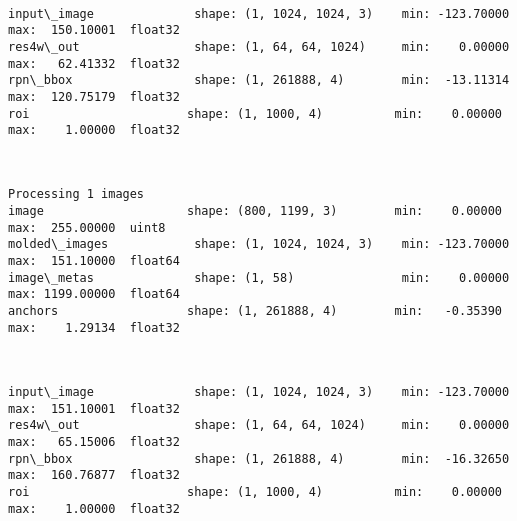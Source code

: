 \documentclass[11pt]{article}
\begin{document}
    \begin{center}
    \end{center}
    { \hspace*{\fill} \\}
    
    \begin{Verbatim}[commandchars=\\\{\}]
input\_image              shape: (1, 1024, 1024, 3)    min: -123.70000  max:  150.10001  float32
res4w\_out                shape: (1, 64, 64, 1024)     min:    0.00000  max:   62.41332  float32
rpn\_bbox                 shape: (1, 261888, 4)        min:  -13.11314  max:  120.75179  float32
roi                      shape: (1, 1000, 4)          min:    0.00000  max:    1.00000  float32

    \end{Verbatim}

    \begin{center}
    \end{center}
    { \hspace*{\fill} \\}
    
    \begin{Verbatim}[commandchars=\\\{\}]
Processing 1 images
image                    shape: (800, 1199, 3)        min:    0.00000  max:  255.00000  uint8
molded\_images            shape: (1, 1024, 1024, 3)    min: -123.70000  max:  151.10000  float64
image\_metas              shape: (1, 58)               min:    0.00000  max: 1199.00000  float64
anchors                  shape: (1, 261888, 4)        min:   -0.35390  max:    1.29134  float32

    \end{Verbatim}

    \begin{center}
    \end{center}
    { \hspace*{\fill} \\}
    
    \begin{Verbatim}[commandchars=\\\{\}]
input\_image              shape: (1, 1024, 1024, 3)    min: -123.70000  max:  151.10001  float32
res4w\_out                shape: (1, 64, 64, 1024)     min:    0.00000  max:   65.15006  float32
rpn\_bbox                 shape: (1, 261888, 4)        min:  -16.32650  max:  160.76877  float32
roi                      shape: (1, 1000, 4)          min:    0.00000  max:    1.00000  float32

    \end{Verbatim}
\end{document}
